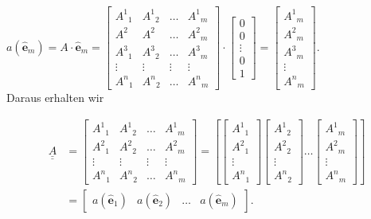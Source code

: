\documentclass[10pt]{article}
\begin{document}
$a\left(\hat{\mathbf{e}}_{m}\right)=A \cdot \hat{\mathbf{e}}_{m}=\left[\begin{array}{cccc}A^{1}{ }_{1} & A^{1}{ }_{2} & \ldots & A^{1}{ }_{m} \\ A^{2} & A^{2} & \ldots & A^{2}{ }_{m} \\ A^{3}{ }_{1} & A^{3}{ }_{2} & \ldots & A^{3}{ }_{m} \\ \vdots & \vdots & \vdots & \vdots \\ A^{n}{ }_{1} & A^{n}{ }_{2} & \ldots & A^{n}{ }_{m}\end{array}\right] \cdot\left[\begin{array}{c}0 \\ 0 \\ \vdots \\ 0 \\ 1\end{array}\right]=\left[\begin{array}{c}A^{1}{ }_{m} \\ A^{2}{ }_{m} \\ A^{3}{ }_{m} \\ \vdots \\ A^{n}{ }_{m}\end{array}\right]$.\\
Daraus erhalten wir


\begin{align*}
\underline{\underline{A}} & =\left[\begin{array}{cccc}
A^{1}{ }_{1} & A^{1}{ }_{2} & \ldots & A^{1}{ }_{m} \\
A^{2}{ }_{1} & A^{2}{ }_{2} & \ldots & A^{2}{ }_{m} \\
\vdots & \vdots & \vdots & \vdots \\
A^{n}{ }_{1} & A^{n}{ }_{2} & \ldots & A^{n}{ }_{m}
\end{array}\right]=\left[\left[\begin{array}{c}
A^{1}{ }_{1} \\
A^{2}{ }_{1} \\
\vdots \\
A^{n}{ }_{1}
\end{array}\right]\left[\begin{array}{c}
A^{1}{ }_{2} \\
A^{2}{ }_{2} \\
\vdots \\
A^{n}{ }_{2}
\end{array}\right] \ldots\left[\begin{array}{c}
A^{1}{ }_{m} \\
A^{2}{ }_{m} \\
\vdots \\
A^{n}{ }_{m}
\end{array}\right]\right] \\
& =\left[\begin{array}{llll}
a\left(\hat{\mathbf{e}}_{1}\right) & a\left(\hat{\mathbf{e}}_{2}\right) & \ldots & a\left(\hat{\mathbf{e}}_{m}\right)
\end{array}\right] . \tag{6.50}
\end{align*}
\end{document}
